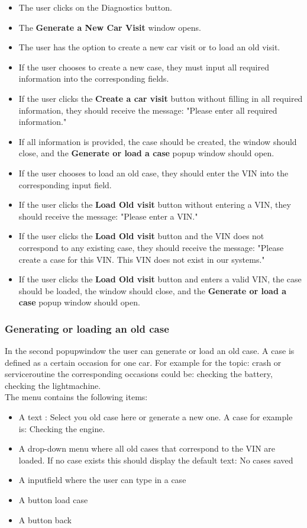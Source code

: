 \documentclass[]{scrreprt}
\begin{document}
\begin{itemize}
    \item The user clicks on the Diagnostics button.
    \item The \textbf{Generate a New Car Visit} window opens.
    \item The user has the option to create a new car visit or to load an old visit.
    \item If the user chooses to create a new case, they must input all required information into the corresponding fields.
    \item If the user clicks the \textbf{Create a car visit} button without filling in all required information, they should receive the message: "Please enter all required information."
    \item If all information is provided, the case should be created, the window should close, and the \textbf{Generate or load a case} popup window should open.
    \item If the user chooses to load an old case, they should enter the VIN into the corresponding input field.
    \item If the user clicks the \textbf{Load Old visit} button without entering a VIN, they should receive the message: "Please enter a VIN."
    \item If the user clicks the \textbf{Load Old visit} button and the VIN does not correspond to any existing case, they should receive the message: "Please create a case for this VIN. This VIN does not exist in our systems."
    \item If the user clicks the \textbf{Load Old visit} button and enters a valid VIN, the case should be loaded, the window should close, and the \textbf{Generate or load a case} popup window should open.
\end{itemize}


\subsubsection{Generating or loading an old case}




In the second popupwindow the user can generate or load an old case. A case is defined as a certain occasion for one car. For example for the topic: crash or serviceroutine the corresponding occasions could be: checking the battery,
checking the lightmachine.
\\
The menu contains the following items:
\begin{itemize}
    \item A text : Select you old case here or generate a new one. A case for example is: Checking the engine.
    \item A drop-down menu where all old cases that correspond to the VIN are loaded. If no case exists this should display the default text: No cases saved
    \item A inputfield where the user can type in a case
    \item A button load case
    \item A button back
\end{itemize}
\end{document}
